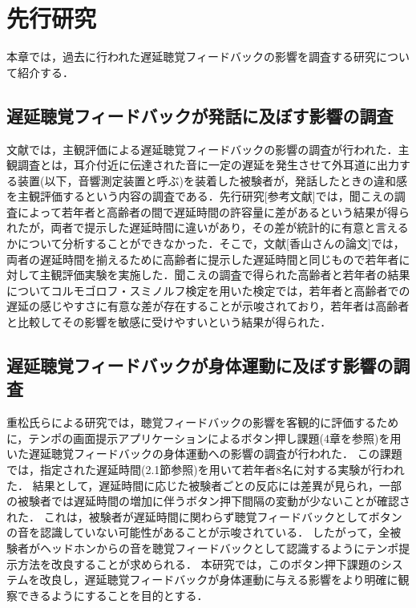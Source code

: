 \chapter{先行研究}
本章では，過去に行われた遅延聴覚フィードバックの影響を調査する研究について紹介する．
\section{遅延聴覚フィードバックが発話に及ぼす影響の調査}
文献\cite{kayama}では，主観評価による遅延聴覚フィードバックの影響の調査が行われた．主観調査とは，耳介付近に伝達された音に一定の遅延を発生させて外耳道に出力する装置(以下，音響測定装置と呼ぶ)を装着した被験者が，発話したときの違和感を主観評価するという内容の調査である．先行研究[参考文献]では，聞こえの調査によって若年者と高齢者の間で遅延時間の許容量に差があるという結果が得られたが，両者で提示した遅延時間に違いがあり，その差が統計的に有意と言えるかについて分析することができなかった．そこで，文献[香山さんの論文]では，両者の遅延時間を揃えるために高齢者に提示した遅延時間と同じもので若年者に対して主観評価実験を実施した．聞こえの調査で得られた高齢者と若年者の結果についてコルモゴロフ・スミノルフ検定を用いた検定では，若年者と高齢者での遅延の感じやすさに有意な差が存在することが示唆されており，若年者は高齢者と比較してその影響を敏感に受けやすいという結果が得られた．
\section{遅延聴覚フィードバックが身体運動に及ぼす影響の調査}
重松氏らによる研究\cite{shigematu}では，聴覚フィードバックの影響を客観的に評価するために，テンポの画面提示アプリケーションによるボタン押し課題(4章を参照)を用いた遅延聴覚フィードバックの身体運動への影響の調査が行われた．
この課題では，指定された遅延時間(2.1節参照)を用いて若年者8名に対する実験が行われた．
結果として，遅延時間に応じた被験者ごとの反応には差異が見られ，一部の被験者では遅延時間の増加に伴うボタン押下間隔の変動が少ないことが確認された．
これは，被験者が遅延時間に関わらず聴覚フィードバックとしてボタンの音を認識していない可能性があることが示唆されている．
したがって，全被験者がヘッドホンからの音を聴覚フィードバックとして認識するようにテンポ提示方法を改良することが求められる．
本研究では，このボタン押下課題のシステムを改良し，遅延聴覚フィードバックが身体運動に与える影響をより明確に観察できるようにすることを目的とする．

